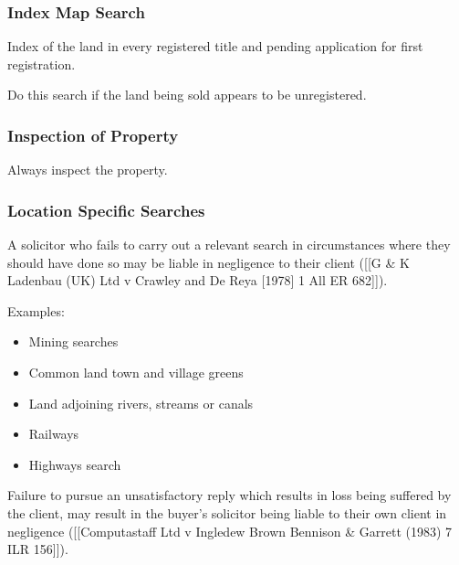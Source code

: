 \documentclass[
]{article}
\newenvironment{Shaded}{}{}
\newcommand{\NormalTok}[1]{#1}
\providecommand{\tightlist}{%
  \setlength{\itemsep}{0pt}\setlength{\parskip}{0pt}}
\begin{document}
\hypertarget{index-map-search}{%
\subsubsection{Index Map Search}\label{index-map-search}}

Index of the land in every registered title and pending application for
first registration.

\begin{Shaded}
\begin{Highlighting}[]
\NormalTok{Do this search if the land being sold appears to be unregistered. }
\end{Highlighting}
\end{Shaded}

\hypertarget{inspection-of-property}{%
\subsubsection{Inspection of Property}\label{inspection-of-property}}

Always inspect the property.

\hypertarget{location-specific-searches}{%
\subsubsection{Location Specific
Searches}\label{location-specific-searches}}

A solicitor who fails to carry out a relevant search in circumstances
where they should have done so may be liable in negligence to their
client ({[}{[}G \& K Ladenbau (UK) Ltd v Crawley and De Reya {[}1978{]}
1 All ER 682{]}{]}).

Examples:

\begin{itemize}
\tightlist
\item
  Mining searches
\item
  Common land town and village greens
\item
  Land adjoining rivers, streams or canals
\item
  Railways
\item
  Highways search
\end{itemize}

Failure to pursue an unsatisfactory reply which results in loss being
suffered by the client, may result in the buyer's solicitor being liable
to their own client in negligence ({[}{[}Computastaff Ltd v Ingledew
Brown Bennison \& Garrett (1983) 7 ILR 156{]}{]}).
\end{document}
